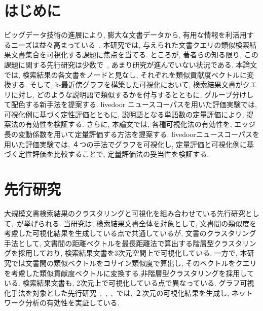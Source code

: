 \documentclass[a4j,fleqn,10pt]{jarticle}
\begin{document}


\maketitle



\section{はじめに}
ビッグデータ技術の進展により, 膨大な文書データから, 有用な情報を利活用するニーズは益々高まっている~\cite{ikeda17}.
本研究では, 与えられた文書クエリの類似検索結果文書集合を可視化する課題に焦点を当てる. 
ところが, 著者らの知る限り, この課題に関する先行研究は少数で~\cite{oda04}, あまり研究が進んでいない状況である. 
本論文では, 検索結果の各文書をノードと見なし, それぞれを類似貢献度ベクトルに変換する. 
そして, k-最近傍グラフを構築した可視化において, 検索結果文書がクエリに対し, 
どのような説明語で類似するかを付与するとともに, グループ分けして配色する新手法を提案する. 
livedoor ニュースコーパスを用いた評価実験では, 可視化例に基づく定性評価とともに, 
説明語となる単語数の定量評価により, 提案法の有効性を検証する.
さらに, 本論文では, 各種可視化法の有効性を, エッジ長の変動係数を用いて定量評価する方法を提案する. 
livedoorニュースコーパスを用いた評価実験では, ４つの手法でグラフを可視化し, 
定量評価と可視化例に基づく定性評価を比較することで, 定量評価法の妥当性を検証する.

\section{先行研究}
大規模文書検索結果のクラスタリングと可視化を組み合わせている先行研究として,~\cite{oda04}が挙げられる.
当研究は, 検索結果文書全体を対象として, 文書間の類似度を考慮した可視化結果を生成している点で共通しているが,
文書のクラスタリング手法として, 文書間の距離ベクトルを最長距離法で算出する階層型クラスタリングを採用しており,
検索結果文書を3次元空間上で可視化している.
一方で, 本研究では文書間の類似ベクトルをコサイン類似度で算出し,
そのベクトルをクエリを考慮した類似貢献度ベクトルに変換する,非階層型クラスタリングを採用している. 
検索結果文書も, 2次元上で可視化している点で異なっている.
グラフ可視化手法を対象とした先行研究~\cite{saito},~\cite{YST},~\cite{BETT},~\cite{C}では, 
２次元の可視化結果を生成し, ネットワーク分析の有効性を実証している.
\end{document}
